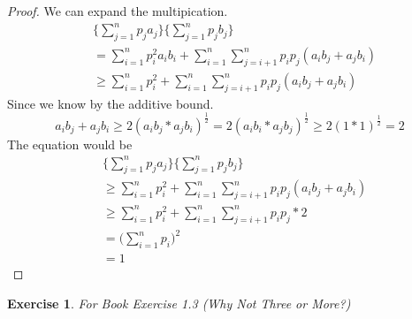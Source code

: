 \documentclass{article}
\newtheorem{exercise}{Exercise}[section]
\begin{document}
\begin{proof}
    We can expand the multipication.
    \begin{align*}
        & \bigg\{\sum_{j = 1}^{n}{p_ja_j}\bigg\} \bigg\{\sum_{j = 1}^{n}{p_jb_j}\bigg\} \\
        & = \sum_{i = 1}^{n}{p_i^2a_ib_i} + \sum_{i = 1}^{n}\sum_{j = i+1}^n{p_ip_j(a_ib_j + a_jb_i)} \\
        & \geq \sum_{i = 1}^{n}{p_i^2} + \sum_{i = 1}^{n}\sum_{j = i+1}^n{p_ip_j(a_ib_j + a_jb_i)}
    \end{align*}
    Since we know by the additive bound.
    \begin{equation*}
        a_ib_j + a_jb_i \geq 2(a_ib_j * a_jb_i)^{\frac{1}{2}} = 2(a_ib_i * a_jb_j)^{\frac{1}{2}} \geq 2(1*1)^{\frac{1}{2}} = 2
    \end{equation*}
    The equation would be
    \begin{align*}
        & \bigg\{\sum_{j = 1}^{n}{p_ja_j}\bigg\} \bigg\{\sum_{j = 1}^{n}{p_jb_j}\bigg\} \\
        & \geq \sum_{i = 1}^{n}{p_i^2} + \sum_{i = 1}^{n}\sum_{j = i+1}^n{p_ip_j(a_ib_j + a_jb_i)} \\
        & \geq \sum_{i = 1}^{n}{p_i^2} + \sum_{i = 1}^{n}\sum_{j = i+1}^n{p_ip_j*2} \\
        & = \bigg(\sum_{i = 1}^n{p_i}\bigg)^2 \\
        & = 1
    \end{align*}
\end{proof}

\begin{exercise}
    For Book Exercise 1.3 (Why Not Three or More?)
\end{exercise}
\end{document}
